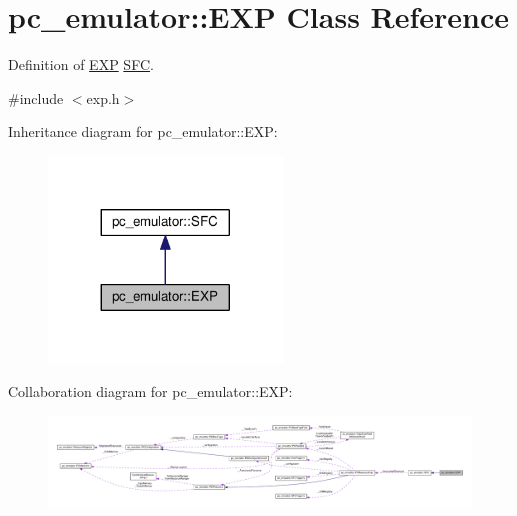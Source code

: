 \hypertarget{classpc__emulator_1_1EXP}{}\section{pc\+\_\+emulator\+:\+:E\+XP Class Reference}
\label{classpc__emulator_1_1EXP}


Definition of \hyperlink{classpc__emulator_1_1EXP}{E\+XP} \hyperlink{classpc__emulator_1_1SFC}{S\+FC}.  




{\ttfamily \#include $<$exp.\+h$>$}



Inheritance diagram for pc\+\_\+emulator\+:\+:E\+XP\+:\nopagebreak
\begin{figure}[H]
\begin{center}
\leavevmode
\includegraphics[width=176pt]{classpc__emulator_1_1EXP__inherit__graph}
\end{center}
\end{figure}


Collaboration diagram for pc\+\_\+emulator\+:\+:E\+XP\+:\nopagebreak
\begin{figure}[H]
\begin{center}
\leavevmode
\includegraphics[width=350pt]{classpc__emulator_1_1EXP__coll__graph}
\end{center}
\end{figure}
